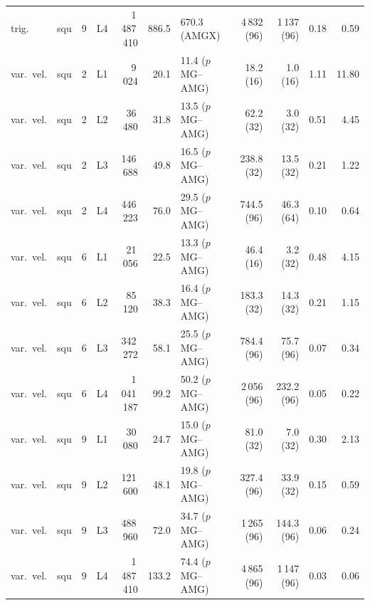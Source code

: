 \begin{tabular}{llrrrrlrrrr}
trig. & squ & 9 & L4 & 1\,487\,410 & 886.5 & 670.3 (AMGX) & 4\,832 (96) & 1\,137 (96) & 0.18 & 0.59\\
var.\ vel. & squ & 2 & L1 & 9\,024 & 20.1 & 11.4 ($p$MG--AMG) & 18.2 (16) & 1.0 (16) & 1.11 & 11.80\\
var.\ vel. & squ & 2 & L2 & 36\,480 & 31.8 & 13.5 ($p$MG--AMG) & 62.2 (32) & 3.0 (32) & 0.51 & 4.45\\
var.\ vel. & squ & 2 & L3 & 146\,688 & 49.8 & 16.5 ($p$MG--AMG) & 238.8 (32) & 13.5 (32) & 0.21 & 1.22\\
var.\ vel. & squ & 2 & L4 & 446\,223 & 76.0 & 29.5 ($p$MG--AMG) & 744.5 (96) & 46.3 (64) & 0.10 & 0.64\\
var.\ vel. & squ & 6 & L1 & 21\,056 & 22.5 & 13.3 ($p$MG--AMG) & 46.4 (16) & 3.2 (32) & 0.48 & 4.15\\
var.\ vel. & squ & 6 & L2 & 85\,120 & 38.3 & 16.4 ($p$MG--AMG) & 183.3 (32) & 14.3 (32) & 0.21 & 1.15\\
var.\ vel. & squ & 6 & L3 & 342\,272 & 58.1 & 25.5 ($p$MG--AMG) & 784.4 (96) & 75.7 (96) & 0.07 & 0.34\\
var.\ vel. & squ & 6 & L4 & 1\,041\,187 & 99.2 & 50.2 ($p$MG--AMG) & 2\,056 (96) & 232.2 (96) & 0.05 & 0.22\\
var.\ vel. & squ & 9 & L1 & 30\,080 & 24.7 & 15.0 ($p$MG--AMG) & 81.0 (32) & 7.0 (32) & 0.30 & 2.13\\
var.\ vel. & squ & 9 & L2 & 121\,600 & 48.1 & 19.8 ($p$MG--AMG) & 327.4 (96) & 33.9 (32) & 0.15 & 0.59\\
var.\ vel. & squ & 9 & L3 & 488\,960 & 72.0 & 34.7 ($p$MG--AMG) & 1\,265 (96) & 144.3 (96) & 0.06 & 0.24\\
var.\ vel. & squ & 9 & L4 & 1\,487\,410 & 133.2 & 74.4 ($p$MG--AMG) & 4\,865 (96) & 1\,147 (96) & 0.03 & 0.06\\
\bottomrule
\end{tabular}
